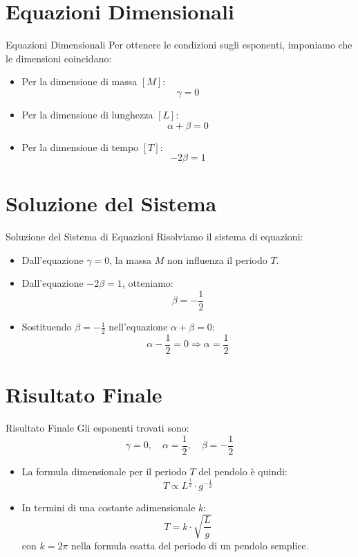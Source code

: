 \documentclass{beamer}
\begin{document}
\section{Equazioni Dimensionali}

\begin{frame}{Equazioni Dimensionali}
    Per ottenere le condizioni sugli esponenti, imponiamo che le dimensioni coincidano:
    \begin{itemize}
        \item Per la dimensione di massa $[M]$:
        $$ \gamma = 0 $$
        \item Per la dimensione di lunghezza $[L]$:
        $$ \alpha + \beta = 0 $$
        \item Per la dimensione di tempo $[T]$:
        $$ -2\beta = 1 $$
    \end{itemize}
\end{frame}

\section{Soluzione del Sistema}

\begin{frame}{Soluzione del Sistema di Equazioni}
    Risolviamo il sistema di equazioni:
    \begin{itemize}
        \item Dall'equazione $\gamma = 0$, la massa $ M $ non influenza il periodo $ T $.
        \item Dall'equazione $-2\beta = 1$, otteniamo:
        $$ \beta = -\frac{1}{2} $$
        \item Sostituendo $\beta = -\frac{1}{2}$ nell'equazione $\alpha + \beta = 0$:
        $$ \alpha - \frac{1}{2} = 0 \Rightarrow \alpha = \frac{1}{2} $$
    \end{itemize}
\end{frame}

\section{Risultato Finale}

\begin{frame}{Risultato Finale}
    Gli esponenti trovati sono:
    $$ \gamma = 0, \quad \alpha = \frac{1}{2}, \quad \beta = -\frac{1}{2} $$
    \begin{itemize}
        \item La formula dimensionale per il periodo $ T $ del pendolo è quindi:
        $$ T \propto L^{\frac{1}{2}} \cdot g^{-\frac{1}{2}} $$
        \item In termini di una costante adimensionale $ k $:
        $$ T = k \cdot \sqrt{\frac{L}{g}} $$
        con $ k = 2\pi $ nella formula esatta del periodo di un pendolo semplice.
    \end{itemize}
\end{frame}
\end{document}
